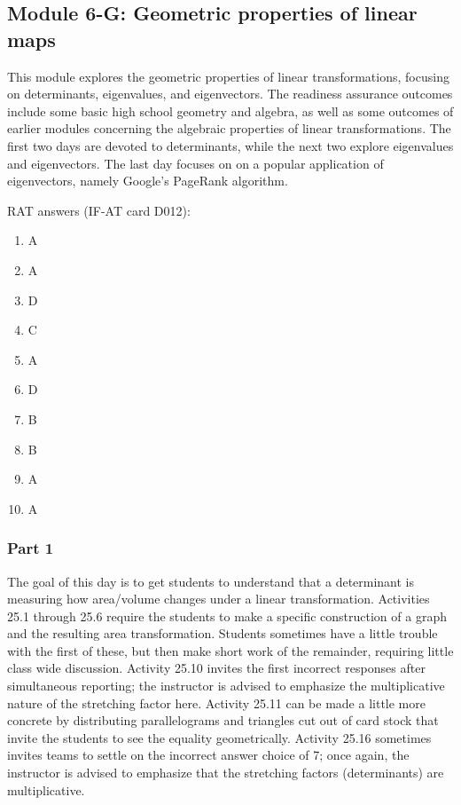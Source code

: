 \documentclass{article}
\begin{document}
\subsection*{Module 6-G: Geometric properties of linear maps}

This module explores the geometric properties of linear transformations, focusing on determinants, eigenvalues, and eigenvectors.  The readiness assurance outcomes include some basic high school geometry and algebra, as well as some outcomes of earlier modules concerning the algebraic properties of linear transformations.  The first two days are devoted to determinants, while the next two explore eigenvalues and eigenvectors.  The last day focuses on on a popular application of eigenvectors, namely Google's PageRank algorithm.

RAT answers (IF-AT card D012):
\begin{multicols}{10}
\begin{enumerate}[1)]
\item A
\item A
\item D
\item C
\item A
\item D
\item B
\item B
\item A
\item A
\end{enumerate}
\end{multicols}

\subsubsection*{Part 1}
The goal of this day is to get students to understand that a determinant is measuring how area/volume changes under a linear transformation.  Activities 25.1 through 25.6 require the students to make a specific construction of a graph and the resulting area transformation.  Students sometimes have a little trouble with the first of these, but then make short work of the remainder, requiring little class wide discussion.  Activity 25.10 invites the first incorrect responses after simultaneous reporting; the instructor is advised to emphasize the multiplicative nature of the stretching factor here.  Activity 25.11 can be made a little more concrete by distributing parallelograms and triangles cut out of card stock that invite the students to see the equality geometrically.  Activity 25.16 sometimes invites teams to settle on the incorrect answer choice of 7; once again, the instructor is advised to emphasize that the stretching factors (determinants) are multiplicative.
\end{document}
